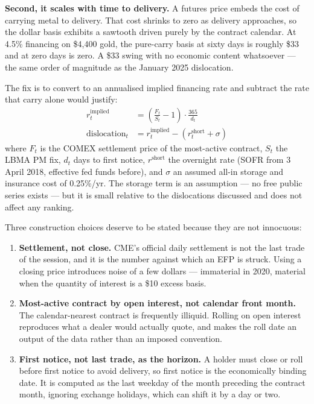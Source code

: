 \documentclass[11pt,a4paper]{article}
\begin{document}
\textbf{Second, it scales with time to delivery.} A futures price embeds the cost of carrying
metal to delivery. That cost shrinks to zero as delivery approaches, so the dollar basis
exhibits a sawtooth driven purely by the contract calendar. At 4.5\% financing on \$4{,}400
gold, the pure-carry basis at sixty days is roughly \$33 and at zero days is zero. A \$33 swing
with no economic content whatsoever --- the same order of magnitude as the January 2025
dislocation.

The fix is to convert to an annualised implied financing rate and subtract the rate that carry
alone would justify:
\begin{align}
r^{\text{implied}}_t &= \left(\frac{F_t}{S_t} - 1\right)\cdot\frac{365}{d_t} \\[0.3em]
\text{dislocation}_t &= r^{\text{implied}}_t - \left(r^{\text{short}}_t + \sigma\right)
\end{align}
where $F_t$ is the COMEX settlement price of the most-active contract, $S_t$ the LBMA PM fix,
$d_t$ days to first notice, $r^{\text{short}}$ the overnight rate (SOFR from 3 April 2018,
effective fed funds before), and $\sigma$ an assumed all-in storage and insurance cost of
0.25\%/yr. The storage term is an assumption --- no free public series exists --- but it is
small relative to the dislocations discussed and does not affect any ranking.

Three construction choices deserve to be stated because they are not innocuous:

\begin{enumerate}[leftmargin=*]
\item \textbf{Settlement, not close.} CME's official daily settlement is not the last trade of
the session, and it is the number against which an EFP is struck. Using a closing price
introduces noise of a few dollars --- immaterial in 2020, material when the quantity of
interest is a \$10 excess basis.
\item \textbf{Most-active contract by open interest, not calendar front month.} The
calendar-nearest contract is frequently illiquid. Rolling on open interest reproduces what a
dealer would actually quote, and makes the roll date an output of the data rather than an
imposed convention.
\item \textbf{First notice, not last trade, as the horizon.} A holder must close or roll before
first notice to avoid delivery, so first notice is the economically binding date. It is
computed as the last weekday of the month preceding the contract month, ignoring exchange
holidays, which can shift it by a day or two.
\end{enumerate}
\end{document}
